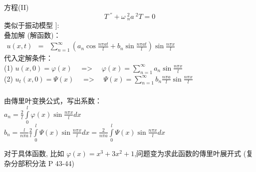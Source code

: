 \begin{frame}
      \frametitle{}
      方程(II) \[  T~^{''} +\omega ~_n ^2 {a~^2 T}=0 \]
      类似于振动模型 {\color{red}{[例3]}}]: \\
      叠加解 (解函数)：\\
      $\begin{array}{llll}
          u(x,t) &=& \sum\limits_{n=1}^{\infty }  (a_n\cos\frac{ n\pi at}{l}+ b_n\sin \frac{ n\pi at}{l}) \sin \frac{ n\pi x}{l}
      \end{array}$ \\ \vspace{1em}  	
    代入定解条件：\\ 
	(1) $ \displaystyle u(x,0)= \varphi (x)$ ~~=> ~~$\varphi (x)=\sum_{n=1}^{\infty } a_n \sin \frac{ n\pi x}{l}$\\  
	(2) $ \displaystyle u_t(x,0)= \Psi (x)$ ~~=> ~~$\Psi (x)=\sum_{n=1}^{\infty } b_n \frac{ n\pi a}{l} \sin \frac{ n\pi x}{l}$ \\  \vspace{0.3cm} 
\end{frame}

\begin{frame}
	\frametitle{}	
	由傳里叶变换公式，写出系数：\\  
	$ \displaystyle a_n=  \frac{2}{l}\int\limits_{0 }^{l}  \varphi (x) \sin \frac{ n\pi x}{l} dx $\\   
	$ \displaystyle b_n= \frac{l} { n\pi a} \frac{2}{l}\int\limits_{0 }^{l}  \Psi  (x) \sin \frac{ n\pi x}{l} dx =  \frac{2} { n\pi a}  \int\limits_{0 }^{l}  \Psi  (x) \sin \frac{ n\pi x}{l} dx$\\  \vspace*{2em}

    {\color{red}{[X]}}对于具体函数, 比如 $\varphi(x)=x^3+ 3x^2 +1$,问题变为求此函数的傳里叶展开式 (复杂分部积分法 P 43-44) 
\end{frame}	

